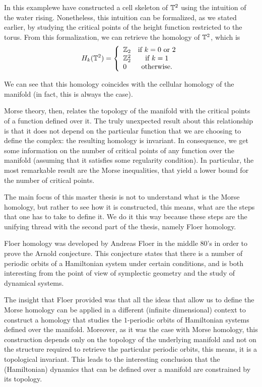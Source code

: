 In this examplewe have constructed a cell skeleton of $\mathbb{T}^2$ using the intuition of the water rising. Nonetheless, this intuition can be formalized, as we stated earlier, by studying the critical points of the height function restricted to the torus. From this formalization, we can retrieve the homology of $\mathbb{T}^2$, which is
\[H_k(\mathbb{T}^2) = \left\{ \begin{array}{lc} \mathbb{Z}_2 & \text{if } k=0 \text{ or } 2 \\ \mathbb{Z}_2^2 & \text{if } k=1 \\ 0 & \text{otherwise.} \end{array} \right.\]

We can see that this homology coincides with the cellular homology of the manifold (in fact, this is always the case).

Morse theory, then, relates the topology of the manifold with the critical points of a function defined over it. The truly unexpected result about this relationship is that it does not depend on the particular function that we are choosing to define the complex: the resulting homology is invariant. In consequence, we get some information on the number of critical points of any function over the manifold (assuming that it satisfies some regularity condition). In particular, the most remarkable result are the Morse inequalities, that yield a lower bound for the number of critical points.

The main focus of this master thesis is not to understand what is the Morse homology, but rather to see how it is constructed, this means, what are the steps that one has to take to define it. We do it this way because these steps are the unifying thread with the second part of the thesis, namely Floer homology.

Floer homology was developed by Andreas Floer in the middle 80's in order to prove the Arnold conjecture. This conjecture states that there is a number of periodic orbits of a Hamiltonian system under certain conditions, and is both interesting from the point of view of symplectic geometry and the study of dynamical systems.

The insight that Floer provided was that all the ideas that allow us to define the Morse homology can be applied in a different (infinite dimensional) context to construct a homology that studies the $1$-periodic orbits of Hamiltonian systems defined over the manifold. Moreover, as it was the case with Morse homology, this construction depends only on the topology of the underlying manifold and not on the structure required to retrieve the particular periodic orbits, this means, it is a topological invariant. This leads to the interesting conclusion that the (Hamiltonian) dynamics that can be defined over a manifold are constrained by its topology.

